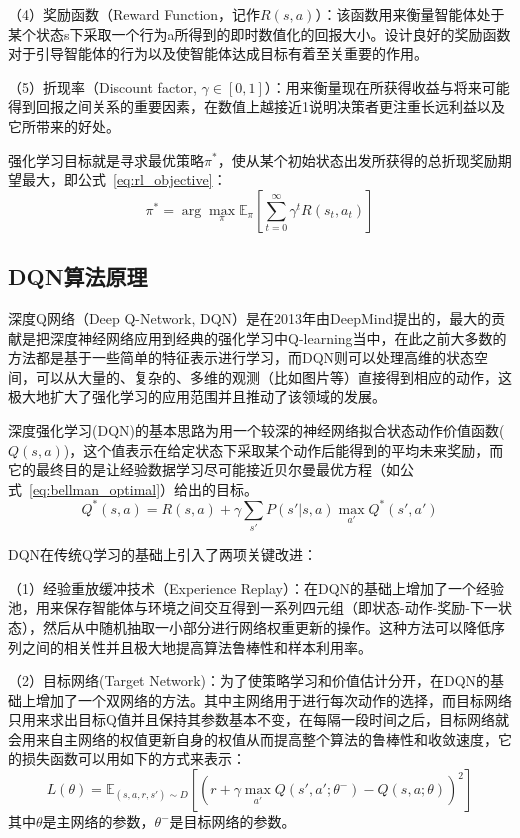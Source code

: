 （4）奖励函数（Reward Function，记作$R(s,a)$）：该函数用来衡量智能体处于某个状态s下采取一个行为a所得到的即时数值化的回报大小。设计良好的奖励函数对于引导智能体的行为以及使智能体达成目标有着至关重要的作用。

（5）折现率（Discount factor, $γ ∈ [0, 1]$）：用来衡量现在所获得收益与将来可能得到回报之间关系的重要因素，在数值上越接近1说明决策者更注重长远利益以及它所带来的好处。

强化学习目标就是寻求最优策略$\pi^*$，使从某个初始状态出发所获得的总折现奖励期望最大，即公式~\ref{eq:rl_objective}：
\begin{equation}
\pi^* = \arg\max_{\pi} \mathbb{E}_{\pi}\left[ \sum_{t=0}^{\infty} \gamma^t R(s_t, a_t) \right]
\label{eq:rl_objective}
\end{equation}

\subsection{DQN算法原理}
深度Q网络（Deep Q-Network, DQN）是在2013年由DeepMind提出的，最大的贡献是把深度神经网络应用到经典的强化学习中Q-learning当中，在此之前大多数的方法都是基于一些简单的特征表示进行学习，而DQN则可以处理高维的状态空间，可以从大量的、复杂的、多维的观测（比如图片等）直接得到相应的动作，这极大地扩大了强化学习的应用范围并且推动了该领域的发展\cite{xiu2024dqn}。

深度强化学习(DQN)的基本思路为用一个较深的神经网络拟合状态动作价值函数($Q(s,a)$)，这个值表示在给定状态下采取某个动作后能得到的平均未来奖励，而它的最终目的是让经验数据学习尽可能接近贝尔曼最优方程（如公式~\ref{eq:bellman_optimal}）给出的目标。
\begin{equation}
Q^{*}(s,a) = R(s,a) + \gamma \sum_{s'} P(s'|s,a) \max_{a'} Q^{*}(s',a')
\label{eq:bellman_optimal}
\end{equation}

DQN在传统Q学习的基础上引入了两项关键改进：

（1）经验重放缓冲技术（Experience Replay）：在DQN的基础上增加了一个经验池，用来保存智能体与环境之间交互得到一系列四元组（即状态-动作-奖励-下一状态），然后从中随机抽取一小部分进行网络权重更新的操作。这种方法可以降低序列之间的相关性并且极大地提高算法鲁棒性和样本利用率。

（2）目标网络(Target Network)：为了使策略学习和价值估计分开，在DQN的基础上增加了一个双网络的方法。其中主网络用于进行每次动作的选择，而目标网络只用来求出目标Q值并且保持其参数基本不变，在每隔一段时间之后，目标网络就会用来自主网络的权值更新自身的权值从而提高整个算法的鲁棒性和收敛速度，它的损失函数可以用如下的方式来表示：
\begin{equation}
L(\theta) = \mathbb{E}_{(s,a,r,s') \sim D} \left[ \left( r + \gamma \max_{a'} Q(s',a';\theta^-) - Q(s,a;\theta) \right)^2 \right]
\label{eq:dqn_loss}
\end{equation}
其中$\theta$是主网络的参数，$\theta^-$是目标网络的参数。

